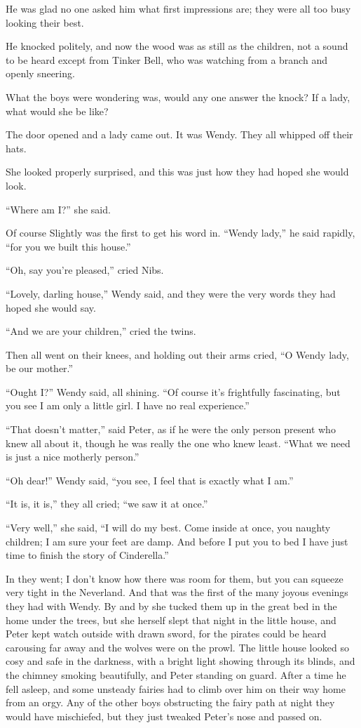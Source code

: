 He was glad no one asked him what first impressions are; they were all
too busy looking their best.

He knocked politely, and now the wood was as still as the children, not
a sound to be heard except from Tinker Bell, who was watching from a
branch and openly sneering.

What the boys were wondering was, would any one answer the knock? If a
lady, what would she be like?

The door opened and a lady came out. It was Wendy. They all whipped off
their hats.

She looked properly surprised, and this was just how they had hoped she
would look.

``Where am I?'' she said.

Of course Slightly was the first to get his word in. ``Wendy lady,'' he
said rapidly, ``for you we built this house.''

``Oh, say you're pleased,'' cried Nibs.

``Lovely, darling house,'' Wendy said, and they were the very words they
had hoped she would say.

``And we are your children,'' cried the twins.

Then all went on their knees, and holding out their arms cried, ``O
Wendy lady, be our mother.''

``Ought I?'' Wendy said, all shining. ``Of course it's frightfully
fascinating, but you see I am only a little girl. I have no real
experience.''

``That doesn't matter,'' said Peter, as if he were the only person
present who knew all about it, though he was really the one who knew
least. ``What we need is just a nice motherly person.''

``Oh dear!'' Wendy said, ``you see, I feel that is exactly what I am.''

``It is, it is,'' they all cried; ``we saw it at once.''

``Very well,'' she said, ``I will do my best. Come inside at once, you
naughty children; I am sure your feet are damp. And before I put you to
bed I have just time to finish the story of Cinderella.''

In they went; I don't know how there was room for them, but you can
squeeze very tight in the Neverland. And that was the first of the many
joyous evenings they had with Wendy. By and by she tucked them up in
the great bed in the home under the trees, but she herself slept that
night in the little house, and Peter kept watch outside with drawn
sword, for the pirates could be heard carousing far away and the wolves
were on the prowl. The little house looked so cosy and safe in the
darkness, with a bright light showing through its blinds, and the
chimney smoking beautifully, and Peter standing on guard. After a time
he fell asleep, and some unsteady fairies had to climb over him on
their way home from an orgy. Any of the other boys obstructing the
fairy path at night they would have mischiefed, but they just tweaked
Peter's nose and passed on.